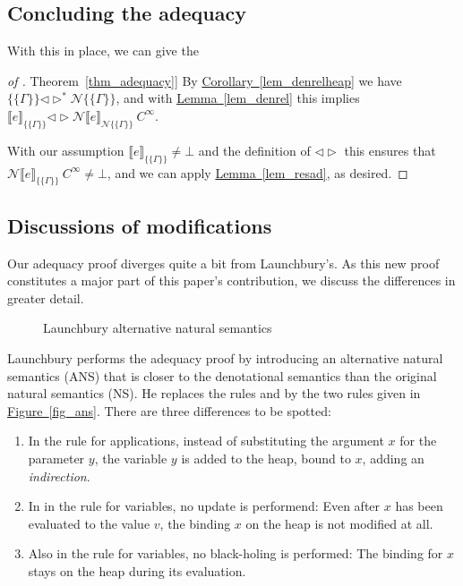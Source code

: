 \documentclass{jfp1}
\newcommand{\myref}[2]{\hyperref[#2]{#1~\ref*{#2}}}
\theoremstyle{nonumberbreak}
\newtheorem{proof}{Proof}
\newcommand{\sApp}[2]{#1\;#2}
\newcommand{\sLam}[2]{\text{\textlambda} #1.\, #2}
\newcommand{\sred}[5]{#1 : #2 \Downarrow_{#3} #4 : #5}
\newcommand{\sRule}[1]{\text{{\textsc{#1}}}}
\newcommand{\dsem}[2]{\llbracket #1 \rrbracket_{#2}}
\newcommand{\esem}[1]{\{\!\!\!\{#1\}\!\!\!\}}
\newcommand{\dsemr}[2]{\mathcal N\!\llbracket #1 \rrbracket_{#2}}
\newcommand{\esemr}[1]{\mathcal N\!\!\{\!\!\!\{#1\}\!\!\!\}}
\newcommand{\dsim}{\mathrel{\triangleleft\triangleright}}
\newcommand{\dsimheap}{\mathrel{\triangleleft\triangleright^*}}
\begin{document}
\subsection{Concluding the adequacy}

With this in place, we can give the
\begin{proof}[of \myref{Theorem}{thm_adequacy}]
By \myref{Corollary}{lem_denrelheap} we have $\esem{\Gamma}\dsimheap \esemr{\Gamma}$, and with \myref{Lemma}{lem_denrel} this implies $\dsem{e}{\esem{\Gamma}} \dsim \dsemr{e}{\esemr{\Gamma}}~C^\infty$.

With our assumption $\dsem{e}{\esem{\Gamma}} \ne \bot$ and the definition of $\dsim$ this ensures that $\dsemr{e}{\esem{\Gamma}}~C^\infty \ne \bot$, and we can apply \myref{Lemma}{lem_resad}, as desired.
\end{proof}


\subsection{Discussions of modifications}
\label{sec_modifications3}

Our adequacy proof diverges quite a bit from Launchbury's. As this new proof constitutes a major part of this paper's contribution, we discuss the differences in greater detail.

\begin{figure}
\caption{Launchbury alternative natural semantics}
\label{fig_natsem}
\end{figure}

Launchbury performs the adequacy proof by introducing an alternative natural semantics (ANS) that is closer to the denotational semantics than the original natural semantics (NS). He replaces the rules \sRule{App} and \sRule{Var} by the two rules given in \myref{Figure}{fig_ans}. There are three differences to be spotted:
\begin{enumerate}
\item In the rule for applications, instead of substituting the argument $x$ for the parameter $y$, the variable $y$ is added to the heap, bound to $x$, adding an \emph{indirection}.
\item In in the rule for variables, no update is performend: Even after $x$ has been evaluated to the value $v$, the binding $x$ on the heap is not modified at all.
\item Also in the rule for variables, no black-holing is performed: The binding for $x$ stays on the heap during its evaluation.
\end{enumerate}
\end{document}

